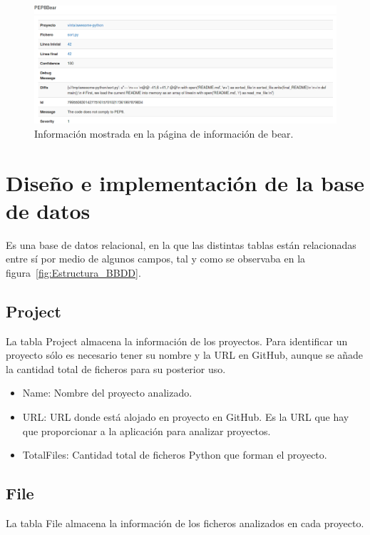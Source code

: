 \documentclass[a4paper, 12pt]{book}
\begin{document}
\begin{figure}[H]
  \centering
  \includegraphics[width=16cm, keepaspectratio]{img/infoBear}
  \caption{Información mostrada en la página de información de bear.}
  \label{fig:infoBear}
\end{figure}

\section{Diseño e implementación de la base de datos} 
\label{sec:seccion14}
Es una base de datos relacional, en la que las distintas tablas están relacionadas entre sí por medio de algunos campos, tal y como se observaba en la figura~\ref{fig:Estructura_BBDD}.

\subsection{Project}
\label{sec:seccion14.1}
La tabla Project almacena la información de los proyectos. Para identificar un proyecto sólo es necesario tener su nombre y la URL en GitHub, aunque se añade la cantidad total de ficheros para su posterior uso.

\begin{itemize}
          \item Name: Nombre del proyecto analizado.
          \item URL: URL donde está alojado en proyecto en GitHub. Es la URL que hay que proporcionar a la aplicación para analizar proyectos.
          \item TotalFiles: Cantidad total de ficheros Python que forman el proyecto.
\end{itemize}

\subsection{File}
\label{sec:seccion14.2}
La tabla File almacena la información de los ficheros analizados en cada proyecto.
\end{document}
